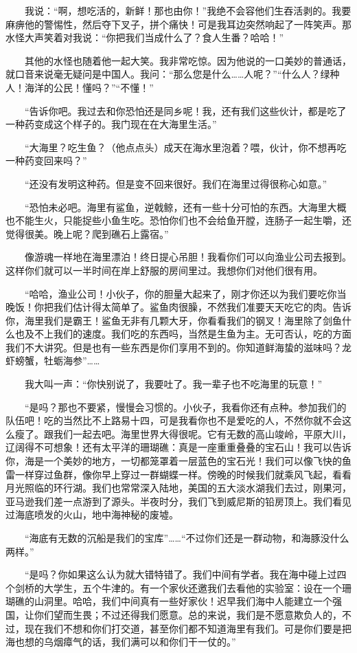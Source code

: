 　　我说：“啊，想吃活的，新鲜！那也由你！”我绝不会容他们生吞活剥的。我要麻痹他的警惕性，然后夺下叉子，拼个痛快！可是我耳边突然响起了一阵笑声。那水怪大声笑着对我说：“你把我们当成什么了？食人生番？哈哈！” 
 
 　　其他的水怪也随着他一起大笑。我非常吃惊。因为他说的一口美妙的普通话，就口音来说毫无疑问是中国人。我问：“那么您是什么……人呢？”“什么人？绿种人！海洋的公民！懂吗？”“不懂！” 
 
 　　“告诉你吧。我过去和你恐怕还是同乡呢！我，还有我们这些伙计，都是吃了一种药变成这个样子的。我门现在在大海里生活。” 
 
 　　“大海里？吃生鱼？（他点点头）成天在海水里泡着？喂，伙计，你不想再吃一种药变回来吗？” 
 
 　　“还没有发明这种药。但是变不回来很好。我们在海里过得很称心如意。” 
 
 　　“恐怕未必吧。海里有鲨鱼，逆戟鲸，还有一些十分可怕的东西。大海里大概也不能生火，只能捉些小鱼生吃。恐怕你们也不会给鱼开膛，连肠子一起生嚼，还觉得很美。晚上呢？爬到礁石上露宿。” 
 
 　　像游魂一样地在海里漂泊！终日提心吊胆！我看你们可以向渔业公司去报到。这样你们就可以一半时间在岸上舒服的房间里过。我想你们对他们很有用。 
 
 　　“哈哈，渔业公司！小伙子，你的胆量大起来了，刚才你还以为我们要吃你当晚饭！你把我们估计得太简单了。鲨鱼肉很臊，不然我们准要天天吃它的肉。告诉你，海里我们是霸王！鲨鱼无非有几颗大牙，你看看我们的钢叉！海里除了剑鱼什么也及不上我们的速度。我们吃的东西吗，当然是生鱼为主。无可否认，吃的方面我们不大讲究。但是也有一些东西是你们享用不到的。你知道鲜海蛰的滋味吗？龙虾螃蟹，牡蛎海参”…… 
 
 　　我大叫一声：“你快别说了，我要吐了。我一辈子也不吃海里的玩意！” 
 
 　　“是吗？那也不要紧，慢慢会习惯的。小伙子，我看你还有点种。参加我们的队伍吧！吃的当然比不上路易十四，可是我看你也不是爱吃的人，不然你就不会这么瘦了。跟我们一起去吧。海里世界大得很呢。它有无数的高山竣岭，平原大川，辽阔得不可想象！还有太平洋的珊瑚礁：真是一座重重叠叠的宝石山！我可以告诉你，海是一个美妙的地方，一切都笼罩着一层蓝色的宝石光！我们可以像飞快的鱼雷一样穿过鱼群，像你早上穿过一群蝴蝶一样。傍晚的时候我们就乘风飞起，看看月光照临的环行湖。我们也常常深入陆地，美国的五大淡水湖我们去过，刚果河，亚马逊我们差一点游到了源头。半夜时分，我们飞到威尼斯的铅房顶上。我们看见过海底喷发的火山，地中海神秘的废墟。 
 
 　　“海底有无数的沉船是我们的宝库”……“不过你们还是一群动物，和海豚没什么两样。” 
 
 　　“是吗？你如果这么认为就大错特错了。我们中间有学者。我在海中碰上过四个剑桥的大学生，五个牛津的。有一个家伙还邀我们去看他的实验室：设在一个珊瑚礁的山洞里。哈哈，我们中间真有一些好家伙！迟早我们海中人能建立一个强国，让你们望而生畏；不过还得我们愿意。总的来说，我们是不愿意欺负人的，不过，现在我们不想和你们打交道，甚至你们都不知道海里有我们。可是你们要是把海也想的乌烟瘴气的话，我们满可以和你们干一仗的。” 
 
